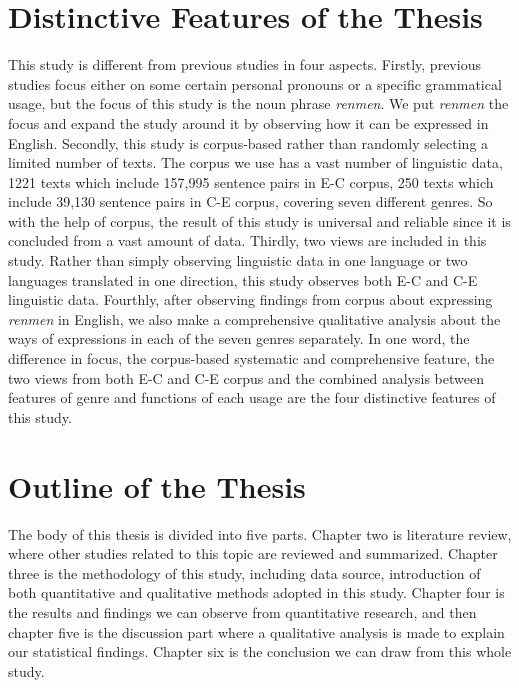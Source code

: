 \documentclass[degree=bachelor,language=english]{thuthesis}
\begin{document}
\section{Distinctive Features of the Thesis}

This study is different from previous studies in four aspects. Firstly, previous studies focus either on some certain personal pronouns or a specific grammatical usage, but the focus of this study is the noun phrase \emph{renmen}. We put \emph{renmen} the focus and expand the study around it by observing how it can be expressed in English. Secondly, this study is corpus-based rather than randomly selecting a limited number of texts. The corpus we use has a vast number of linguistic data, 1221 texts which include 157,995 sentence pairs in E-C corpus, 250 texts which include 39,130 sentence pairs in C-E corpus, covering seven different genres. So with the help of corpus, the result of this study is universal and reliable since it is concluded from a vast amount of data. Thirdly, two views are included in this study. Rather than simply observing linguistic data in one language or two languages translated in one direction, this study observes both E-C and C-E linguistic data. Fourthly, after observing findings from corpus about expressing \emph{renmen} in English, we also make a comprehensive qualitative analysis about the ways of expressions in each of the seven  genres separately. In one word, the difference in focus, the corpus-based systematic and comprehensive feature, the two views from both E-C and C-E corpus and the combined analysis between features of genre and functions of each usage are the four distinctive features of this study.



\section{Outline of the Thesis}

The body of this thesis is divided into five parts. Chapter two is literature review, where other studies related to this topic are reviewed and summarized. Chapter three is the methodology of this study, including data source, introduction of both quantitative and qualitative methods adopted in this study. Chapter four is the results and findings we can observe from quantitative research, and then chapter five is the discussion part where a qualitative analysis is made to explain our statistical findings. Chapter six is the conclusion we can draw from this whole study.
\end{document}
